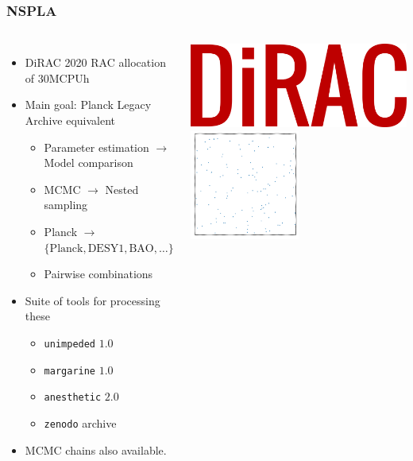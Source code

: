 \documentclass[aspectratio=169]{beamer}
\begin{document}
\begin{frame}
    \frametitle{NSPLA}
    \begin{columns}
        \begin{itemize}
            \item DiRAC 2020 RAC allocation of 30MCPUh
            \item Main goal: Planck Legacy Archive equivalent
                \begin{itemize}
                    \item Parameter estimation $\to$ Model comparison
                    \item MCMC $\to$ Nested sampling
                    \item Planck $\to$ $\{\text{Planck}, \text{DESY1}, \text{BAO}, \ldots \}$
                    \item Pairwise combinations
                \end{itemize}
            \item Suite of tools for processing these 
                \begin{itemize}
                    \item \texttt{unimpeded} $1.0$
                    \item \texttt{margarine} $1.0$
                    \item \texttt{anesthetic} $2.0$
                    \item \texttt{zenodo} archive
                \end{itemize}
            \item MCMC chains also available.
        \end{itemize}
        \includegraphics[width=\textwidth]{logos/dirac}
        \includegraphics[width=0.5\textwidth,page=21]{figures/himmelblau}%

\end{columns}
\end{frame}
\end{document}
